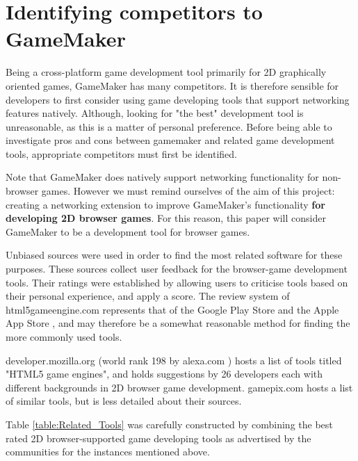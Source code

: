\documentclass[bsc,frontabs,twoside,singlespacing,parskip,deptreport]{infthesis}     %
\begin{document}
\section{Identifying competitors to GameMaker}
Being a cross-platform game development tool primarily for 2D graphically oriented games, GameMaker has many competitors. It is therefore sensible for developers to first consider using game developing tools that support networking features natively. Although, looking for "the best" development tool is unreasonable, as this is a matter of personal preference. Before being able to investigate pros and cons between gamemaker and related game development tools, appropriate competitors must first be identified.

Note that GameMaker does natively support networking functionality for non-browser games. However we must remind ourselves of the aim of this project: creating a networking extension to improve GameMaker's functionality \textbf{for developing 2D browser games}. For this reason, this paper will consider GameMaker to be a development tool for browser games.

Unbiased sources were used in order to find the most related software for these purposes. These sources collect user feedback for the browser-game development tools. Their ratings were established by allowing users to criticise tools based on their personal experience, and apply a score. The review system of html5gameengine.com \cite{html5_gamedev_tools} represents that of the Google Play Store \cite{Google_Play_Store} and the Apple App Store \cite{Apple_App_Store}, and may therefore be a somewhat reasonable method for finding the more commonly used tools.

developer.mozilla.org \cite{html5_mozilla} (world rank 198 by alexa.com \cite{alexa_ranking}) hosts a list of tools titled "HTML5 game engines", and holds suggestions by 26 developers each with different backgrounds in 2D browser game development. gamepix.com \cite{gamepix_engines} hosts a list of similar tools, but is less detailed about their sources.

Table \ref{table:Related_Tools} was carefully constructed by combining the best rated 2D browser-supported game developing tools as advertised by the communities for the instances mentioned above.
\end{document}
